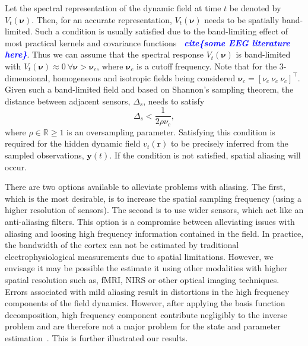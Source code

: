 \documentclass[12pt]{iopart}
\newcommand{\todo}[1]{\textsf{\emph{\textbf{\textcolor{blue}{#1}}}}}
\begin{document}
Let the spectral representation of the dynamic field at time $t$ be denoted by $V_t(\boldsymbol{\nu})$. Then, for an accurate representation, $V_t(\boldsymbol{\nu})$ needs to be spatially band-limited. Such a condition is usually satisfied due to the band-limiting effect of most practical kernels and covariance functions \todo{~cite\{some EEG literature here\}}. Thus we can assume that the spectral response $V_t(\boldsymbol{\nu})$ is band-limited with $V_t(\boldsymbol{\nu}) \approx 0 ~ \forall \boldsymbol{\nu} > \boldsymbol{\nu}_c$, where $\boldsymbol{\nu}_c$ is a cutoff frequency. Note that for the 3-dimensional, homogeneous and isotropic fields being considered $\boldsymbol{\nu}_c = [\nu_c ~ \nu_c ~ \nu_c]^\top$. Given such a band-limited field and based on Shannon's sampling theorem, the distance between adjacent sensors, $\Delta_s$, needs to satisfy 
\begin{equation}
	\label{eq:MinimumSensorDistance} \Delta_s < \frac{1}{2\rho\nu_c}, 
\end{equation}
where $\rho \in \mathbb{R} \ge 1$ is an oversampling parameter. Satisfying this condition is required for the hidden dynamic field $v_t(\mathbf{r})$ to be precisely inferred from the sampled observations, $\mathbf{y}(t)$. If the condition is not satisfied, spatial aliasing will occur. 

There are two options available to alleviate problems with aliasing. The first, which is the most desirable, is to increase the spatial sampling frequency (using a higher resolution of sensors). The second is to use wider sensors, which act like an anti-aliasing filters. This option is a compromise between alleviating issues with aliasing and loosing high frequency information contained in the field. In practice, the bandwidth of the cortex can not be estimated by traditional electrophysiological measurements due to spatial limitations. However, we envisage it may be possible the estimate it using other modalities with higher spatial resolution such as, fMRI, NIRS or other optical imaging techniques. Errors associated with mild aliasing result in distortions in the high frequency components of the field dynamics. However, after applying the basis function decomposition, high frequency component contribute negligibly to the inverse problem and are therefore not a major problem for the state and parameter estimation~\cite{Sanner1992}. This is further illustrated our results.
\end{document}

